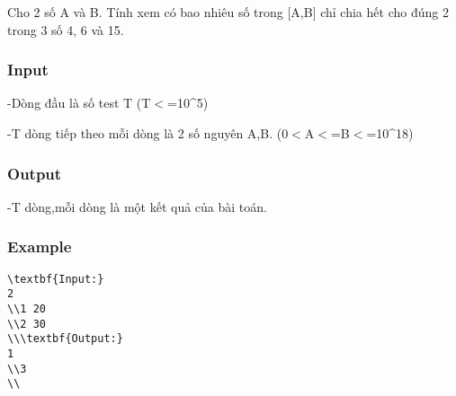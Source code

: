 



   Cho 2 số A và B. Tính xem có bao nhiêu số trong [A,B] chỉ chia hết cho đúng 2 trong 3 số 4, 6 và 15.  

\subsubsection{   Input  }

   -Dòng đầu là số test T (T$<$=10\textasciicircum5)  

   -T dòng tiếp theo mỗi dòng là 2 số nguyên A,B. (0$<$A$<$=B$<$=10\textasciicircum18)  

\subsubsection{   Output  }

   -T dòng,mỗi dòng là một kết quả của bài toán.  



\subsubsection{   Example  }
\begin{verbatim}
\textbf{Input:}
2
\\1 20
\\2 30
\\\textbf{Output:}
1
\\3 
\\\end{verbatim}